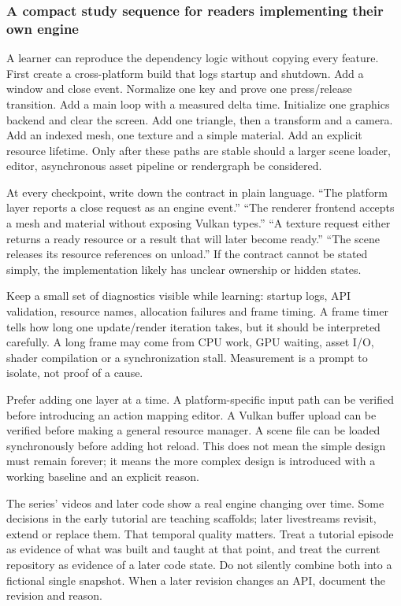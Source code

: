 \subsubsection{A compact study sequence for readers implementing their own engine}\label{a-compact-study-sequence-for-readers-implementing-their-own-engine}

A learner can reproduce the dependency logic without copying every feature. First create a cross-platform build that logs startup and shutdown. Add a window and close event. Normalize one key and prove one press/release transition. Add a main loop with a measured delta time. Initialize one graphics backend and clear the screen. Add one triangle, then a transform and a camera. Add an indexed mesh, one texture and a simple material. Add an explicit resource lifetime. Only after these paths are stable should a larger scene loader, editor, asynchronous asset pipeline or rendergraph be considered.

At every checkpoint, write down the contract in plain language. ``The platform layer reports a close request as an engine event.'' ``The renderer frontend accepts a mesh and material without exposing Vulkan types.'' ``A texture request either returns a ready resource or a result that will later become ready.'' ``The scene releases its resource references on unload.'' If the contract cannot be stated simply, the implementation likely has unclear ownership or hidden states.

Keep a small set of diagnostics visible while learning: startup logs, API validation, resource names, allocation failures and frame timing. A frame timer tells how long one update/render iteration takes, but it should be interpreted carefully. A long frame may come from CPU work, GPU waiting, asset I/O, shader compilation or a synchronization stall. Measurement is a prompt to isolate, not proof of a cause.

Prefer adding one layer at a time. A platform-specific input path can be verified before introducing an action mapping editor. A Vulkan buffer upload can be verified before making a general resource manager. A scene file can be loaded synchronously before adding hot reload. This does not mean the simple design must remain forever; it means the more complex design is introduced with a working baseline and an explicit reason.

The series' videos and later code show a real engine changing over time. Some decisions in the early tutorial are teaching scaffolds; later livestreams revisit, extend or replace them. That temporal quality matters. Treat a tutorial episode as evidence of what was built and taught at that point, and treat the current repository as evidence of a later code state. Do not silently combine both into a fictional single snapshot. When a later revision changes an API, document the revision and reason.


